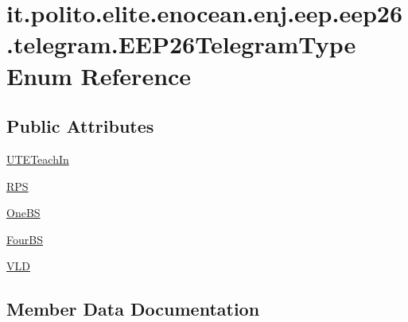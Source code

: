 \hypertarget{enumit_1_1polito_1_1elite_1_1enocean_1_1enj_1_1eep_1_1eep26_1_1telegram_1_1_e_e_p26_telegram_type}{}\section{it.\+polito.\+elite.\+enocean.\+enj.\+eep.\+eep26.\+telegram.\+E\+E\+P26\+Telegram\+Type Enum Reference}
\label{enumit_1_1polito_1_1elite_1_1enocean_1_1enj_1_1eep_1_1eep26_1_1telegram_1_1_e_e_p26_telegram_type}
\subsection*{Public Attributes}
\begin{DoxyCompactItemize}
\item 
\hyperlink{enumit_1_1polito_1_1elite_1_1enocean_1_1enj_1_1eep_1_1eep26_1_1telegram_1_1_e_e_p26_telegram_type_a2c5e99597ec07a0a6428b0a02c9dace4}{U\+T\+E\+Teach\+In}
\item 
\hyperlink{enumit_1_1polito_1_1elite_1_1enocean_1_1enj_1_1eep_1_1eep26_1_1telegram_1_1_e_e_p26_telegram_type_ad2ee7f20f0dfb30c34c1118ee0db6f62}{R\+PS}
\item 
\hyperlink{enumit_1_1polito_1_1elite_1_1enocean_1_1enj_1_1eep_1_1eep26_1_1telegram_1_1_e_e_p26_telegram_type_ad2899c17b2e43131bd57cd03a153d223}{One\+BS}
\item 
\hyperlink{enumit_1_1polito_1_1elite_1_1enocean_1_1enj_1_1eep_1_1eep26_1_1telegram_1_1_e_e_p26_telegram_type_a4440b8e401b5b1aa0f72cbe2a6eb01ca}{Four\+BS}
\item 
\hyperlink{enumit_1_1polito_1_1elite_1_1enocean_1_1enj_1_1eep_1_1eep26_1_1telegram_1_1_e_e_p26_telegram_type_aa4b4b8e74a50a076f2f9126f4cf05bbd}{V\+LD}
\end{DoxyCompactItemize}


\subsection{Member Data Documentation}
\hypertarget{enumit_1_1polito_1_1elite_1_1enocean_1_1enj_1_1eep_1_1eep26_1_1telegram_1_1_e_e_p26_telegram_type_a4440b8e401b5b1aa0f72cbe2a6eb01ca}{}\label{enumit_1_1polito_1_1elite_1_1enocean_1_1enj_1_1eep_1_1eep26_1_1telegram_1_1_e_e_p26_telegram_type_a4440b8e401b5b1aa0f72cbe2a6eb01ca} 
